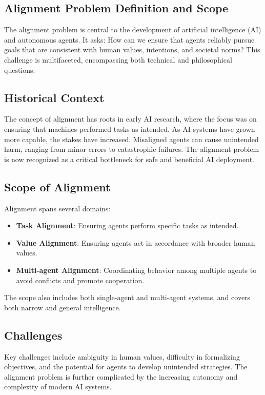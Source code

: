 \begin{TNtwocol}

\section{Alignment Problem Definition and Scope}
The alignment problem is central to the development of artificial intelligence (AI) and autonomous agents. It asks: How can we ensure that agents reliably pursue goals that are consistent with human values, intentions, and societal norms? This challenge is multifaceted, encompassing both technical and philosophical questions. 

\subsection{Historical Context}
The concept of alignment has roots in early AI research, where the focus was on ensuring that machines performed tasks as intended. As AI systems have grown more capable, the stakes have increased. Misaligned agents can cause unintended harm, ranging from minor errors to catastrophic failures. The alignment problem is now recognized as a critical bottleneck for safe and beneficial AI deployment.

\subsection{Scope of Alignment}
Alignment spans several domains:
\begin{itemize}
    \item \textbf{Task Alignment}: Ensuring agents perform specific tasks as intended.
    \item \textbf{Value Alignment}: Ensuring agents act in accordance with broader human values.
    \item \textbf{Multi-agent Alignment}: Coordinating behavior among multiple agents to avoid conflicts and promote cooperation.
\end{itemize}
The scope also includes both single-agent and multi-agent systems, and covers both narrow and general intelligence.

\subsection{Challenges}
Key challenges include ambiguity in human values, difficulty in formalizing objectives, and the potential for agents to develop unintended strategies. The alignment problem is further complicated by the increasing autonomy and complexity of modern AI systems.


\end{TNtwocol}
